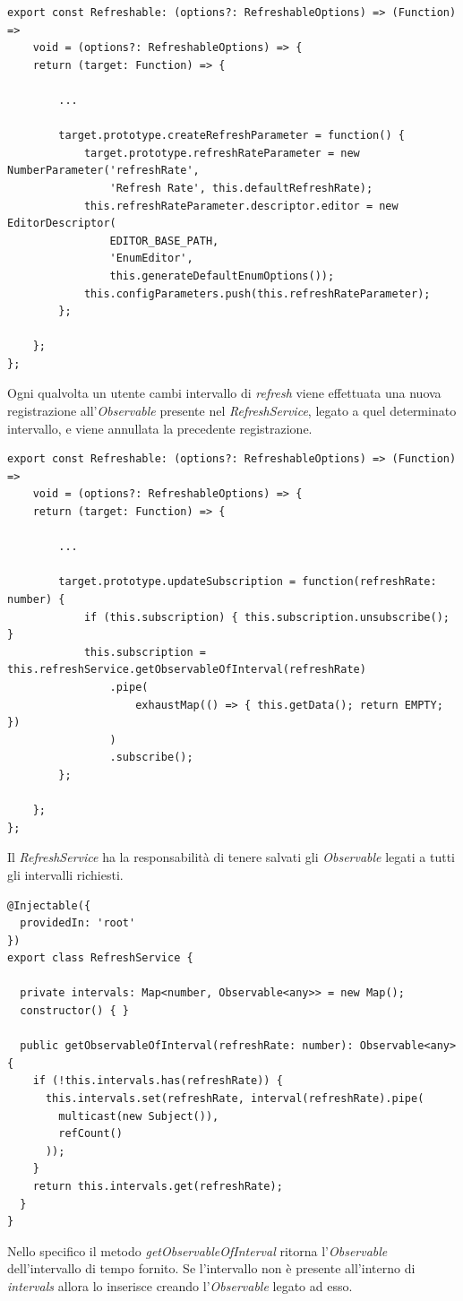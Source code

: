 \begin{lstlisting}[caption={Decorator Refreshable, creazione di refreshRateParameter}, style=javaScriptCode]
export const Refreshable: (options?: RefreshableOptions) => (Function) => 
    void = (options?: RefreshableOptions) => {
    return (target: Function) => {
        
        ...
        
        target.prototype.createRefreshParameter = function() {
            target.prototype.refreshRateParameter = new NumberParameter('refreshRate', 
                'Refresh Rate', this.defaultRefreshRate);
            this.refreshRateParameter.descriptor.editor = new EditorDescriptor(
                EDITOR_BASE_PATH,
                'EnumEditor',
                this.generateDefaultEnumOptions());
            this.configParameters.push(this.refreshRateParameter);
        };
        
    };
};
\end{lstlisting}
Ogni qualvolta un utente cambi intervallo di \textit{refresh} viene effettuata una nuova registrazione all'\textit{Observable} presente nel \textit{RefreshService}, legato a quel determinato intervallo, e viene annullata la precedente registrazione.

\begin{lstlisting}[caption={Decorator Refreshable, metodo updateSubscription}, style=javaScriptCode]
export const Refreshable: (options?: RefreshableOptions) => (Function) => 
    void = (options?: RefreshableOptions) => {
    return (target: Function) => {
        
        ...

        target.prototype.updateSubscription = function(refreshRate: number) {
            if (this.subscription) { this.subscription.unsubscribe(); }
            this.subscription = this.refreshService.getObservableOfInterval(refreshRate)
                .pipe(
                    exhaustMap(() => { this.getData(); return EMPTY; })
                )
                .subscribe();
        };
        
    };
};
\end{lstlisting}
Il \textit{RefreshService} ha la responsabilità di tenere salvati gli \textit{Observable} legati a tutti gli intervalli richiesti.

\begin{lstlisting}[caption={Classe RefreshService}, style=javaScriptCode]
@Injectable({
  providedIn: 'root'
})
export class RefreshService {

  private intervals: Map<number, Observable<any>> = new Map();
  constructor() { }

  public getObservableOfInterval(refreshRate: number): Observable<any> {
    if (!this.intervals.has(refreshRate)) {
      this.intervals.set(refreshRate, interval(refreshRate).pipe(
        multicast(new Subject()),
        refCount()
      ));
    }
    return this.intervals.get(refreshRate);
  }
}
\end{lstlisting}
Nello specifico il metodo \textit{getObservableOfInterval} ritorna l'\textit{Observable} dell'intervallo di tempo fornito. Se l'intervallo non è presente all'interno di \textit{intervals} allora lo inserisce creando l'\textit{Observable} legato ad esso.

